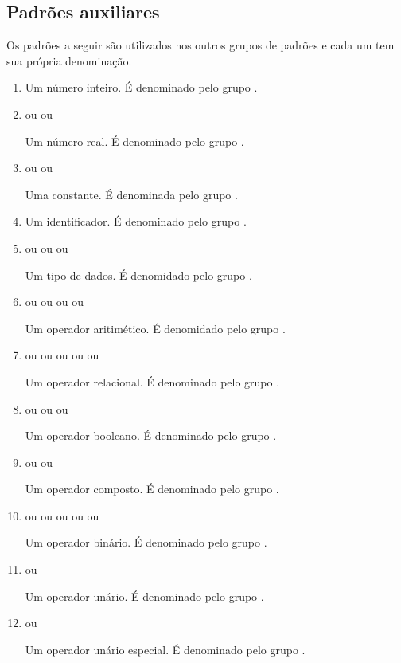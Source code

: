 \documentclass{llncs}
\begin{document}
\subsection{Padrões auxiliares}
Os padrões a seguir são utilizados nos outros grupos de padrões e cada um tem sua própria denominação.

\begin{enumerate}
	\item {}
		
		Um número inteiro. É denominado pelo grupo .
	\item
		 ou
		 ou

		Um número real. É denominado pelo grupo .
	\item {} ou  ou 

		Uma constante. É denominada pelo grupo .
	\item \pat{[[a-zA-Z\_]][[a-zA-Z0-9\_]]^{\star}}

		Um identificador. É denominado pelo grupo .
	\item {} ou  ou  ou 

		Um tipo de dados. É denomidado pelo grupo .
	\item \pat{*} ou \pat{/} ou \pat{\%} ou \pat{+} ou \pat{-}

		Um operador aritimético. É denomidado pelo grupo .
	\item \pat{<} ou \pat{>} ou \pat{<=} ou \pat{>=} ou \pat{==} ou \pat{!=}

		Um operador relacional. É denominado pelo grupo .
	\item \pat{\&\&} ou \pat{||} ou \pat{\&} ou \pat{|}

		Um operador booleano. É denominado pelo grupo .
	\item {} ou \pat{\&=} ou \pat{|=}

		Um operador composto. É denominado pelo grupo .
	\item {} ou  ou  ou  ou \pat{=} ou 

		Um operador binário. É denominado pelo grupo .
	\item \pat{!} ou \pat{-}

		Um operador unário. É denominado pelo grupo .
	\item \pat{++} ou \pat{- -}

		Um operador unário especial. É denominado pelo grupo .
\end{enumerate}
\end{document}
